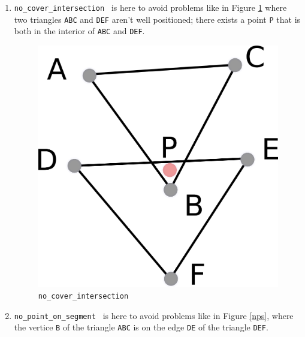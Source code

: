 \documentclass[a4paper,10pt]{article}
\def\ttt#1#2{{\tt{\color{black}#1} #2}}
\begin{document}
\begin{enumerate}
\item \ttt{no\_cover\_intersection}{} is here to avoid problems like in Figure \ref{nci} where two triangles {\tt ABC} and {\tt DEF} aren't well positioned; there exists a point {\tt P} that is both in the interior of {\tt ABC} and {\tt DEF}.
\\
\begin{figure}
\centering
\includegraphics[scale=2]{nci}
\caption{\label{nci} {\tt no\_cover\_intersection}}
\end{figure}
\item \ttt{no\_point\_on\_segment}{} is here to avoid problems like in Figure \ref{nps}, where the vertice {\tt B} of the triangle {\tt ABC} is on the edge {\tt DE} of the triangle {\tt DEF}.
\\
\begin{figure}
\centering

\end{figure}
\end{enumerate}
\end{document}

